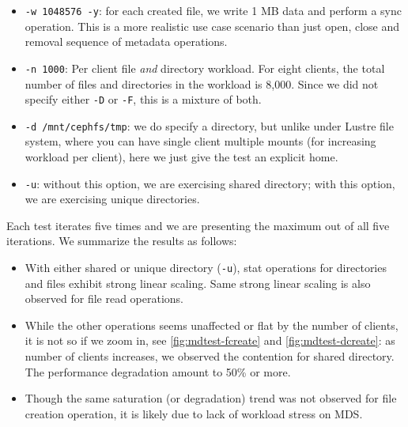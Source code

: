 \begin{itemize}
\item \verb!-w 1048576 -y!: for each created file, we write 1 MB data and
perform a sync operation.  This is a more realistic use case scenario than just
open, close and removal sequence of metadata operations.

\item \verb!-n 1000!: Per client file \textit{and} directory workload. For eight
clients, the total number of files and directories in the workload is 8,000. Since we did not specify
either \verb!-D! or \verb!-F!, this is a mixture of both.

\item \verb!-d /mnt/cephfs/tmp!: we do specify a directory, but unlike under
Lustre file system, where you can have single client multiple mounts (for
increasing workload per client), here we just give the test an explicit home.

\item \verb!-u!: without this option, we are exercising shared directory; with
this option, we are exercising unique directories.

\end{itemize}

Each test iterates five times and we are presenting the maximum out of all five iterations. 
We summarize the results as follows:


\begin{itemize}

\item With either shared or unique directory (\verb!-u!), stat
operations for directories and files exhibit strong linear scaling. Same strong
linear scaling is also observed for file read operations. 

\item While the other operations seems unaffected or flat by the number of
clients, it is not so if we zoom in, see \ref{fig:mdtest-fcreate} and
\ref{fig:mdtest-dcreate}:  as number of clients increases, we observed the
contention for shared directory. The performance degradation amount to 50\% or
more.

\item Though the same saturation (or degradation) trend was not observed for
file creation operation, it is likely due to lack of workload stress on MDS.

\end{itemize}

